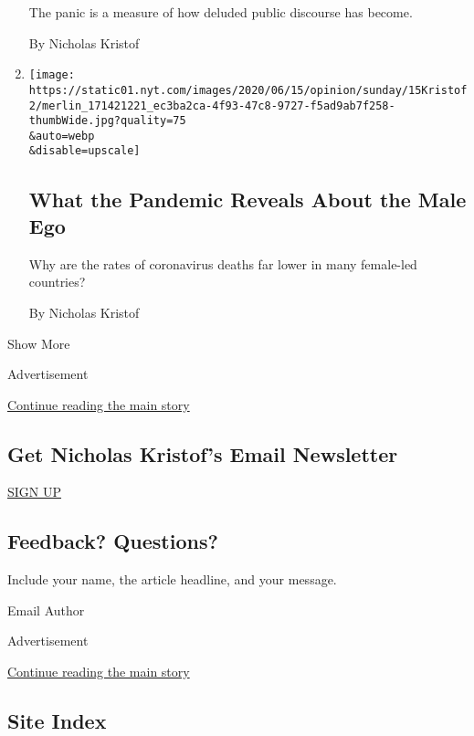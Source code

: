 \begin{enumerate}
  The panic is a measure of how deluded public discourse has become.

  By Nicholas Kristof
\item
  \href{/2020/06/13/opinion/sunday/women-leaders-coronavirus.html}{}

  \texttt{[image: https://static01.nyt.com/images/2020/06/15/opinion/sunday/15Kristof2/merlin\_171421221\_ec3ba2ca-4f93-47c8-9727-f5ad9ab7f258-thumbWide.jpg?quality=75\\\&auto=webp\\\&disable=upscale]}

  \hypertarget{what-the-pandemic-reveals-about-the-male-ego}{%
  \subsection{What the Pandemic Reveals About the Male
  Ego}\label{what-the-pandemic-reveals-about-the-male-ego}}

  Why are the rates of coronavirus deaths far lower in many female-led
  countries?

  By Nicholas Kristof
\end{enumerate}

Show More

Advertisement

\protect\hyperlink{after-mid1}{Continue reading the main story}

\hypertarget{get-nicholas-kristofs-email-newsletter}{%
\subsection{Get Nicholas Kristof's Email
Newsletter}\label{get-nicholas-kristofs-email-newsletter}}

\href{/newsletters/signup/NK}{SIGN UP}

\hypertarget{feedback-questions}{%
\subsection{Feedback? Questions?}\label{feedback-questions}}

Include your name, the article headline, and your message.

Email Author

Advertisement

\protect\hyperlink{after-mktg}{Continue reading the main story}

\hypertarget{site-index}{%
\subsection{Site Index}\label{site-index}}

